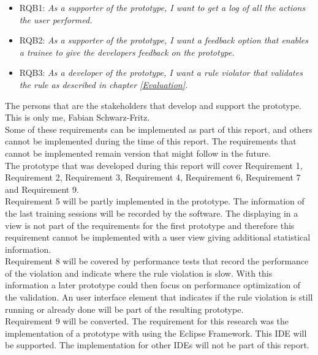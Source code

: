\begin{itemize}
  \item RQB1: \textit{As a supporter of the prototype, I want to get a log of all the actions the user performed.}
  \item RQB2: \textit{As a supporter of the prototype, I want a feedback option that enables a trainee to give the developers feedback on the prototype.}
  \item RQB3: \textit{As a developer of the prototype, I want a rule violator that validates the rule as described in chapter \ref{Evaluation}.}
\end{itemize}

The persons that are the stakeholders that develop and support the prototype. This is only me, Fabian Schwarz-Fritz. 
\\

Some of these requirements can be implemented as part of this report, and others cannot be implemented during the time of this report. The requirements that cannot be implemented remain version that might follow in the future.
\\

The prototype that was developed during this report will cover Requirement 1, Requirement 2, Requirement 3, Requirement 4, Requirement 6, Requirement 7 and Requirement 9. 
\\

Requirement 5 will be partly implemented in the prototype. The information of the last training sessions will be recorded by the software. The displaying in a view is not part of the requirements for the first prototype and therefore this requirement cannot be implemented with a user view giving additional statistical information. 
\\

Requirement 8 will be covered by performance tests that record the performance of the violation and indicate where the rule violation is slow. With this information a later prototype could then focus on performance optimization of the validation. An user interface element that indicates if the rule violation is still running or already done will be part of the resulting prototype.
\\

Requirement 9 will be converted. The requirement for this research was the implementation of a prototype with using the Eclipse Framework. This \ac{IDE} will be supported. The implementation for other \ac{IDE}s will not be part of this report.
\\

